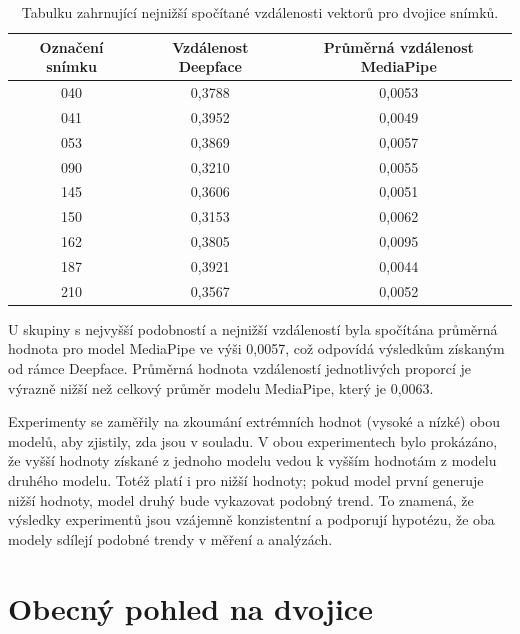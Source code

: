 \begin{table}[H]
        \centering
        \renewcommand{\arraystretch}{1.15}
        \begin{tabular}{|c|c|c|}
                \hline
                Označení snímku & Vzdálenost Deepface & Průměrná vzdálenost MediaPipe \\
                \hline
                040 & 0,3788 & 0,0053 \\
                041 & 0,3952 & 0,0049 \\
                053 & 0,3869 & 0,0057 \\
                090 & 0,3210 & 0,0055 \\
                145 & 0,3606 & 0,0051 \\
                150 & 0,3153 & 0,0062 \\
                162 & 0,3805 & 0,0095 \\
                187 & 0,3921 & 0,0044 \\
                210 & 0,3567 & 0,0052 \\
                \hline
        \end{tabular}
        \caption{Tabulku zahrnující nejnižší spočítané vzdálenosti vektorů pro dvojice snímků.}
        \label{tab:low-distances}
\end{table}

U skupiny s nejvyšší podobností a nejnižší vzdáleností byla spočítána průměrná hodnota pro model MediaPipe ve výši 0,0057, což odpovídá výsledkům získaným od rámce Deepface. Průměrná hodnota vzdáleností jednotlivých proporcí je výrazně nižší než celkový průměr modelu MediaPipe, který je 0,0063.

\bigskip

\noindent Experimenty se zaměřily na zkoumání extrémních hodnot (vysoké a nízké) obou modelů, aby zjistily, zda jsou v souladu. V obou experimentech bylo prokázáno, že vyšší hodnoty získané z jednoho modelu vedou k vyšším hodnotám z modelu druhého modelu. Totéž platí i pro nižší hodnoty; pokud model první generuje nižší hodnoty, model druhý bude vykazovat podobný trend. To znamená, že výsledky experimentů jsou vzájemně konzistentní a podporují hypotézu, že oba modely sdílejí podobné trendy v měření a analýzách.

\section{Obecný pohled na dvojice}
\label{personal-evaluation}

